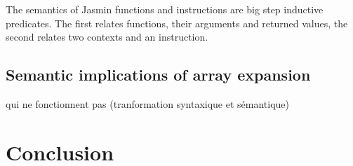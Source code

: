 \documentclass{article}
\begin{document}
The semantics of Jasmin functions and instructions are big step inductive
predicates. The first relates functions, their arguments and returned values,
the second relates two contexts and an instruction.





\subsection{Semantic implications of array expansion}

qui ne fonctionnent pas (tranformation syntaxique et sémantique)


\section{}

\section{Conclusion}
\end{document}

